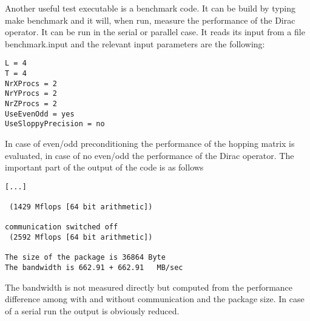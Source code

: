 Another useful test executable is a benchmark code. It can be build by
typing {\ttfamily make benchmark} and it will, when run, measure the
performance of the Dirac operator. It can be run in the serial or
parallel case. It reads its input from a file {\ttfamily
  benchmark.input} and the relevant input parameters are the
following:
\begin{verbatim}
L = 4
T = 4
NrXProcs = 2
NrYProcs = 2
NrZProcs = 2
UseEvenOdd = yes
UseSloppyPrecision = no
\end{verbatim}
In case of even/odd preconditioning the performance of the hopping
matrix is evaluated, in case of no even/odd the performance of the
Dirac operator. The important part of the output of the code is as
follows
\begin{verbatim}
[...]

 (1429 Mflops [64 bit arithmetic])

communication switched off
 (2592 Mflops [64 bit arithmetic])

The size of the package is 36864 Byte
The bandwidth is 662.91 + 662.91   MB/sec
\end{verbatim}
The bandwidth is not measured directly but computed from the
performance difference among with and without communication and the
package size. In case of a serial run the output is obviously
reduced. 



